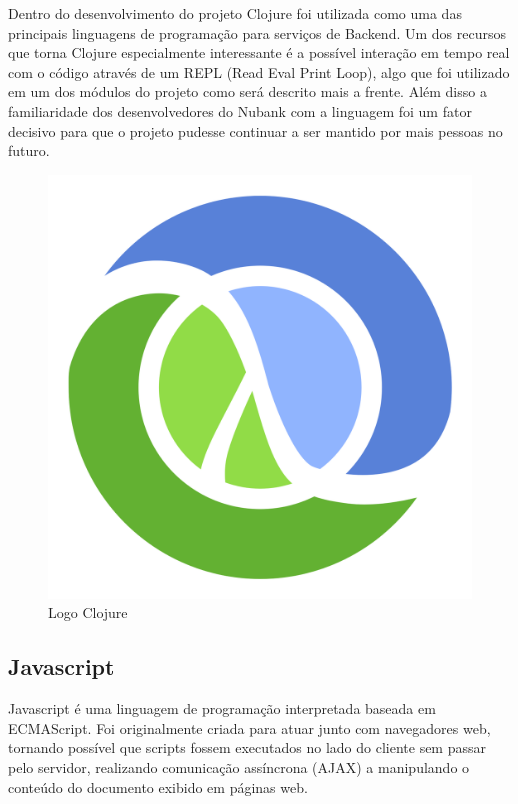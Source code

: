 	        Dentro do desenvolvimento do projeto Clojure foi utilizada como uma das principais linguagens de programação para serviços de Backend. Um dos recursos que torna Clojure especialmente interessante é a possível interação em tempo real com o código através de um REPL (Read Eval Print Loop), algo que foi utilizado em um dos módulos do projeto como será descrito mais a frente. Além disso a familiaridade dos desenvolvedores do Nubank com a linguagem foi um fator decisivo para que o projeto pudesse continuar a ser mantido por mais pessoas no futuro.
	
        	\begin{figure}
        	    \centering
        	    \includegraphics[scale=0.1]{pictures/clojure_logo.png}
        	    \caption{Logo Clojure}
        	    \label{fig:logo_clojure}
        	\end{figure}
	
        \subsection{Javascript} %
            Javascript é uma linguagem de programação interpretada baseada em ECMAScript. Foi originalmente criada para atuar junto com navegadores web, tornando possível que scripts fossem executados no lado do cliente sem passar pelo servidor, realizando comunicação assíncrona (AJAX) a manipulando o conteúdo do documento exibido em páginas web.
            
